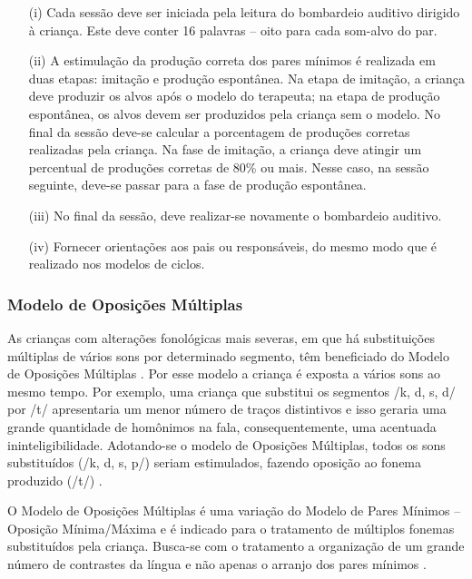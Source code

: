 \documentclass[output=paper,colorlinks,citecolor=brown,booklanguage=portuguese]{langscibook}
\begin{document}
\begin{itemize}
\item [(i)] Cada sessão deve ser iniciada pela leitura do bombardeio auditivo dirigido à criança. Este deve conter 16 palavras -- oito para cada som-alvo do par.
\item [(ii)] A estimulação da produção correta dos pares mínimos é realizada em duas etapas: imitação e produção espontânea. Na etapa de imitação, a criança deve produzir os alvos após o modelo do terapeuta; na etapa de produção espontânea, os alvos devem ser produzidos pela criança sem o modelo. No final da sessão deve-se calcular a porcentagem de produções corretas realizadas pela criança. Na fase de imitação, a criança deve atingir um percentual de produções corretas de 80\% ou mais. Nesse caso, na sessão seguinte, deve-se passar para a fase de produção espontânea.
\item [(iii)] No final da sessão, deve realizar-se novamente o bombardeio auditivo.
\item [(iv)] Fornecer orientações aos pais ou responsáveis, do mesmo modo que é realizado nos modelos de ciclos.
\end{itemize}

\subsubsection{Modelo de Oposições Múltiplas}\label{sec:cap5sec2doisquatro}

As crianças com alterações fonológicas mais severas, em que há substituições múltiplas de vários sons por determinado segmento, têm beneficiado do Modelo de Oposições Múltiplas \citep{Williams2000}. Por esse modelo a criança é exposta a vários sons ao mesmo tempo. Por exemplo, uma criança que substitui os segmentos /k, d, s, d/ por /t/ apresentaria um menor número de traços distintivos e isso geraria uma grande quantidade de homônimos na fala, consequentemente, uma acentuada ininteligibilidade. Adotando-se o modelo de Oposições Múltiplas, todos os sons substituídos (/k, d, s, p/) seriam estimulados, fazendo oposição ao fonema produzido (/t/) \citep{Williams2000, Pagliarin2009a}.

O Modelo de Oposições Múltiplas é uma variação do Modelo de Pares Mínimos -- Oposição Mínima/Máxima e é indicado para o tratamento de múltiplos fonemas substituídos pela criança. Busca-se com o tratamento a organização de um grande número de contrastes da língua e não apenas o arranjo dos pares mínimos \citep{Williams2003}.
\end{document}
